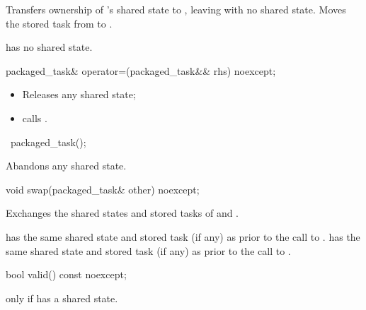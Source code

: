 \begin{itemdescr}
\pnum
\effects
Transfers ownership of
's shared state to , leaving  with no
shared state. Moves the stored task from  to .

\pnum
\ensures
{} has no shared state.
\end{itemdescr}

%
\begin{itemdecl}
packaged_task& operator=(packaged_task&& rhs) noexcept;
\end{itemdecl}

\begin{itemdescr}
\pnum
\effects
\begin{itemize}
\item
Releases any shared state;
\item
calls .
\end{itemize}
\end{itemdescr}

%
\begin{itemdecl}
~packaged_task();
\end{itemdecl}

\begin{itemdescr}
\pnum
\effects
Abandons any shared state.
\end{itemdescr}

%
\begin{itemdecl}
void swap(packaged_task& other) noexcept;
\end{itemdecl}

\begin{itemdescr}
\pnum
\effects
Exchanges the shared states and stored tasks of  and .

\pnum
\ensures
{} has the same shared state
and stored task (if any) as 
prior to the call to .  has the same shared state
and stored task (if any)
as  prior to the call to .
\end{itemdescr}

%
\begin{itemdecl}
bool valid() const noexcept;
\end{itemdecl}

\begin{itemdescr}
\pnum
\returns
{} only if  has a shared state.
\end{itemdescr}

